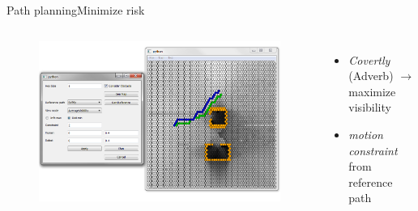 \begin{frame}{Path planning}{Minimize risk}

\begin{columns}
\begin{figure}
\centering
\includegraphics[width = \textwidth]{./screenshot/risk_min_path.png}
\end{figure}

\begin{minipage}{\textwidth}
\begin{itemize}
\item \emph{Covertly} (Adverb) $ \rightarrow $ maximize visibility
\item \emph{motion constraint} from reference path
\end{itemize}
\end{minipage}
\end{columns}

\end{frame}